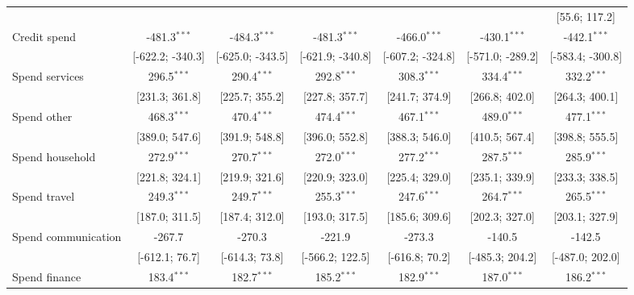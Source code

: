 \begin{table}[htbp]
\begin{threeparttable}[b]
\begin{tabular}{lcccccc}
                                   &                  &                  &                  &                  &                  & [55.6; 117.2]\\   
         Credit spend              & -481.3$^{***}$   & -484.3$^{***}$   & -481.3$^{***}$   & -466.0$^{***}$   & -430.1$^{***}$   & -442.1$^{***}$\\   
                                   & [-622.2; -340.3] & [-625.0; -343.5] & [-621.9; -340.8] & [-607.2; -324.8] & [-571.0; -289.2] & [-583.4; -300.8]\\   
         Spend services            & 296.5$^{***}$    & 290.4$^{***}$    & 292.8$^{***}$    & 308.3$^{***}$    & 334.4$^{***}$    & 332.2$^{***}$\\   
                                   & [231.3; 361.8]   & [225.7; 355.2]   & [227.8; 357.7]   & [241.7; 374.9]   & [266.8; 402.0]   & [264.3; 400.1]\\   
         Spend other               & 468.3$^{***}$    & 470.4$^{***}$    & 474.4$^{***}$    & 467.1$^{***}$    & 489.0$^{***}$    & 477.1$^{***}$\\   
                                   & [389.0; 547.6]   & [391.9; 548.8]   & [396.0; 552.8]   & [388.3; 546.0]   & [410.5; 567.4]   & [398.8; 555.5]\\   
         Spend household           & 272.9$^{***}$    & 270.7$^{***}$    & 272.0$^{***}$    & 277.2$^{***}$    & 287.5$^{***}$    & 285.9$^{***}$\\   
                                   & [221.8; 324.1]   & [219.9; 321.6]   & [220.9; 323.0]   & [225.4; 329.0]   & [235.1; 339.9]   & [233.3; 338.5]\\   
         Spend travel              & 249.3$^{***}$    & 249.7$^{***}$    & 255.3$^{***}$    & 247.6$^{***}$    & 264.7$^{***}$    & 265.5$^{***}$\\   
                                   & [187.0; 311.5]   & [187.4; 312.0]   & [193.0; 317.5]   & [185.6; 309.6]   & [202.3; 327.0]   & [203.1; 327.9]\\   
         Spend communication       & -267.7           & -270.3           & -221.9           & -273.3           & -140.5           & -142.5\\   
                                   & [-612.1; 76.7]   & [-614.3; 73.8]   & [-566.2; 122.5]  & [-616.8; 70.2]   & [-485.3; 204.2]  & [-487.0; 202.0]\\   
         Spend finance             & 183.4$^{***}$    & 182.7$^{***}$    & 185.2$^{***}$    & 182.9$^{***}$    & 187.0$^{***}$    & 186.2$^{***}$\\   

\end{tabular}
\end{threeparttable}
\end{table}
